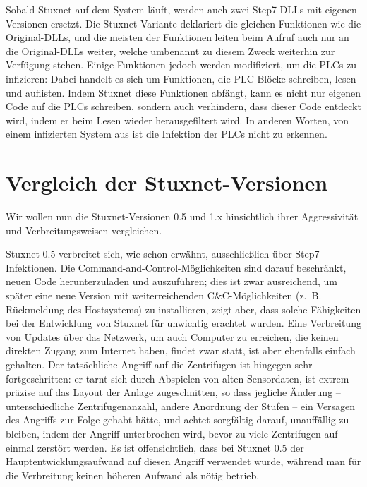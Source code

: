 \documentclass{article}
\begin{document}
Sobald Stuxnet auf dem System läuft, werden auch zwei Step7-DLLs mit eigenen Versionen ersetzt.
Die Stuxnet-Variante deklariert die gleichen Funktionen wie die Original-DLLs,
und die meisten der Funktionen leiten beim Aufruf auch nur an die Original-DLLs weiter,
welche umbenannt zu diesem Zweck weiterhin zur Verfügung stehen.
Einige Funktionen jedoch werden modifiziert, um die PLCs zu infizieren:
Dabei handelt es sich um Funktionen, die PLC-Blöcke schreiben, lesen und auflisten.
Indem Stuxnet diese Funktionen abfängt, kann es nicht nur eigenen Code auf die PLCs schreiben,
sondern auch verhindern, dass dieser Code entdeckt wird, indem er beim Lesen wieder herausgefiltert wird.
In anderen Worten, von einem infizierten System aus ist die Infektion der PLCs nicht zu erkennen.


\section{Vergleich der Stuxnet-Versionen}

Wir wollen nun die Stuxnet-Versionen 0.5 und 1.x hinsichtlich ihrer Aggressivität und Verbreitungsweisen vergleichen.

Stuxnet 0.5 verbreitet sich, wie schon erwähnt, ausschließlich über Step7-Infektionen.
Die Command-and-Control-Möglichkeiten sind darauf beschränkt, neuen Code herunterzuladen und auszuführen;
dies ist zwar ausreichend, um später eine neue Version mit weiterreichenden C\&C-Möglichkeiten (z.~B. Rückmeldung des Hostsystems) zu installieren,
zeigt aber, dass solche Fähigkeiten bei der Entwicklung von Stuxnet für unwichtig erachtet wurden.
Eine Verbreitung von Updates über das Netzwerk, um auch Computer zu erreichen, die keinen direkten Zugang zum Internet haben,
findet zwar statt, ist aber ebenfalls einfach gehalten.
Der tatsächliche Angriff auf die Zentrifugen ist hingegen sehr fortgeschritten:
er tarnt sich durch Abspielen von alten Sensordaten,
ist extrem präzise auf das Layout der Anlage zugeschnitten, so dass jegliche Änderung – unterschiedliche Zentrifugenanzahl, andere Anordnung der Stufen – ein Versagen des Angriffs zur Folge gehabt hätte,
und achtet sorgfältig darauf, unauffällig zu bleiben, indem der Angriff unterbrochen wird, bevor zu viele Zentrifugen auf einmal zerstört werden.
Es ist offensichtlich, dass bei Stuxnet 0.5 der Hauptentwicklungsaufwand auf diesen Angriff verwendet wurde,
während man für die Verbreitung keinen höheren Aufwand als nötig betrieb.
\end{document}
